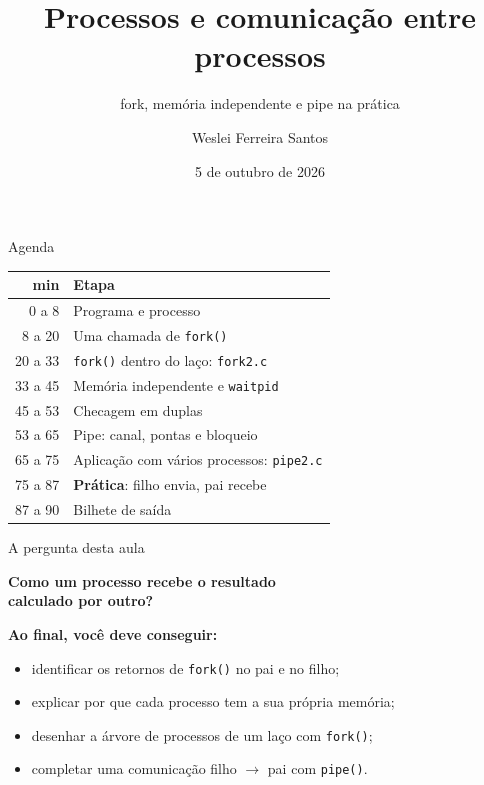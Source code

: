 \documentclass[aspectratio=169]{beamer}
\title{Processos e comunicação entre processos}
\subtitle{fork, memória independente e pipe na prática}
\author{Weslei Ferreira Santos}
\institute{MATA58 · Sistemas Operacionais\\Instituto de Computação / UFBA}
\date{5 de outubro de 2026}
\begin{document}
\maketitle

\begin{frame}{Agenda}
\begin{center}
\small
\begin{tabular}{@{}r@{\hspace{1.2em}}l@{}}
\toprule
\textbf{min} & \textbf{Etapa} \\
\midrule
0 a 8   & Programa e processo \\
8 a 20  & Uma chamada de \texttt{fork()} \\
20 a 33 & \texttt{fork()} dentro do laço: \texttt{fork2.c} \\
33 a 45 & Memória independente e \texttt{waitpid} \\
45 a 53 & Checagem em duplas \\
53 a 65 & Pipe: canal, pontas e bloqueio \\
65 a 75 & Aplicação com vários processos: \texttt{pipe2.c} \\
75 a 87 & \textbf{Prática}: filho envia, pai recebe \\
87 a 90 & Bilhete de saída \\
\bottomrule
\end{tabular}
\end{center}
\end{frame}

\begin{frame}{A pergunta desta aula}
\begin{center}
{\Large \textbf{Como um processo recebe o resultado\\[0.2em] calculado por outro?}}
\end{center}

\vspace{1em}
\textbf{Ao final, você deve conseguir:}
\begin{itemize}
    \item identificar os retornos de \texttt{fork()} no pai e no filho;
    \item explicar por que cada processo tem a sua própria memória;
    \item desenhar a árvore de processos de um laço com \texttt{fork()};
    \item completar uma comunicação filho $\rightarrow$ pai com \texttt{pipe()}.
\end{itemize}
\end{frame}
\end{document}
